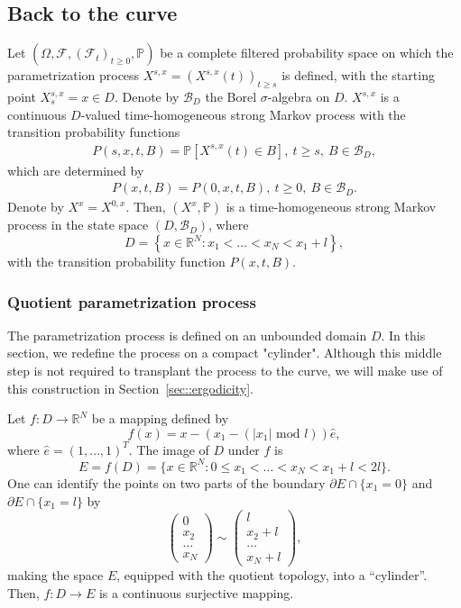 \documentclass[11pt]{article}
\numberwithin{equation}{section}
\theoremstyle{definition}
\begin{document}
\subsection{Back to the curve}\label{sec::back_to_the_curve}
Let $(\Omega, \mathcal{F}, (\mathcal{F}_{t})_{t\ge 0}, \mathbb{P})$ be a complete filtered probability space on which the parametrization process  $X^{s,x}=(X^{s,x}(t))_{t\ge s}$ is defined, with the starting point $X^{s,x}_{s}=x\in D$. Denote by $\mathcal{B}_{D}$ the Borel $\sigma$-algebra on $D$. $X^{s,x}$ is a continuous  $D$-valued time-homogeneous strong Markov process with the transition probability functions
\begin{align*}
    P(s,x,t,B) = \mathbb{P}\left[X^{s,x}(t)\in B\right],\  t\ge s,\ B\in\mathcal{B}_{D},        
\end{align*}
which are determined by 
\begin{align*}
    P(x,t,B) = P(0, x,t,B), \ t\ge 0, \ B\in\mathcal{B}_{D}.
\end{align*}
Denote by $X^{x} =X^{0,x}$. Then, $(X^{x}, \mathbb{P})$ is a time-homogeneous strong Markov process in the state space $(D, \mathcal{B}_{D})$, where 
\[
    D = \left\{x\in\mathbb{R}^{N}:x_{1}<\dots<x_{N}<x_{1}+l\right\},
\]
with the transition probability function $P(x,t,B)$.
\subsubsection*{Quotient parametrization process}
The parametrization process is defined on an unbounded domain $D$. In this section, we redefine the process on a compact "cylinder". Although this middle step is not required to transplant the process to the curve, we will make use of this construction in Section~\ref{sec::ergodicity}.

Let $f:D\to \mathbb{R}^{N}$ be a mapping defined by 
\begin{equation}\label{eq::function_f_D_to_E}
    f(x) = x - (x_{1} - (|x_{1}| \text{ mod } l))\hat{e},
\end{equation}
where $\hat{e} = (1,\dots, 1)^{T}$. The image of $D$ under $f$ is
\[
    E  = f(D) = \{x\in\mathbb{R}^{N}: 0\le x_{1} < \dots< x_{N}< x_{1}+l<2l\}.
\]
One can identify the points on two parts of the boundary $\partial E\cap \{x_{1}=0\}$ and $\partial E\cap \{x_{1}=l\}$ by
\[
    \begin{pmatrix}
    0 \\
    x_{2} \\
    \dots\\
    x_{N}
    \end{pmatrix}
    \sim
    \begin{pmatrix}
    l \\
    x_{2}+l \\
    \dots\\
    x_{N}+l
    \end{pmatrix},
\]
making the space $E$, equipped with the quotient topology, into a ``cylinder''. Then, $f:D\to E$ is a continuous surjective mapping.
\end{document}
